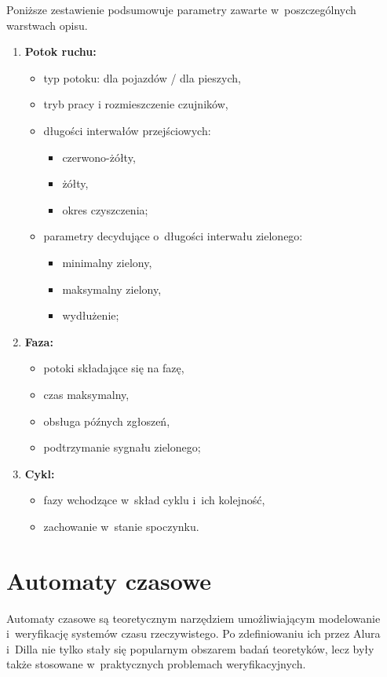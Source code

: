 \documentclass{pracamgr}
\theoremstyle{plain}
\begin{document}
Poniższe zestawienie podsumowuje parametry zawarte w~poszczególnych
warstwach opisu.
\begin{enumerate}
  \item \textbf{Potok ruchu:}
  \begin{itemize}
    \item typ potoku: dla pojazdów / dla pieszych,
    \item tryb pracy i rozmieszczenie czujników,
    \item długości interwałów przejściowych:
    \begin{itemize}
      \item czerwono-żółty,
      \item żółty,
      \item okres czyszczenia;
    \end{itemize}
    \item parametry decydujące o~długości interwału zielonego:
    \begin{itemize}
      \item minimalny zielony,
      \item maksymalny zielony,
      \item wydłużenie;
    \end{itemize}
  \end{itemize}
  \item \textbf{Faza:}
  \begin{itemize}
    \item potoki składające się na fazę,
    \item czas maksymalny,
    \item obsługa późnych zgłoszeń,
    \item podtrzymanie sygnału zielonego;
  \end{itemize}
  \item \textbf{Cykl:}
  \begin{itemize}
    \item fazy wchodzące w~skład cyklu i~ich kolejność,
    \item zachowanie w~stanie spoczynku.
  \end{itemize}
\end{enumerate}

\chapter{Automaty czasowe}
\label{c:ta}
Automaty czasowe są teoretycznym narzędziem umożliwiającym modelowanie
i~weryfikację systemów czasu rzeczywistego. Po zdefiniowaniu ich przez
Alura i~Dilla \cite{alur-dill} nie tylko stały się popularnym obszarem
badań teoretyków, lecz były także stosowane w~praktycznych problemach
weryfikacyjnych.
\end{document}
